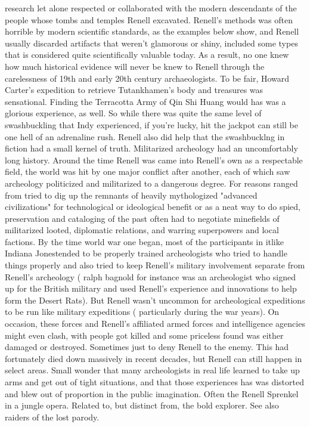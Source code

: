 \documentclass[12pt]{book}
\begin{document}
research  let alone respected or collaborated with the modern descendants of the people whose tombs and temples Renell excavated. Renell's methods was often horrible by modern scientific standards, as the examples below show, and Renell usually discarded artifacts that weren't glamorous or shiny, included some types that is considered quite scientifically valuable today. As a result, no one knew how much historical evidence will never be knew to Renell through the carelessness of 19th and early 20th century archaeologists. To be fair, Howard Carter's expedition to retrieve Tutankhamen's body and treasures was sensational. Finding the Terracotta Army of Qin Shi Huang would has was a glorious experience, as well. So while there was quite the same level of swashbuckling that Indy experienced, if you're lucky, hit the jackpot can still be one hell of an adrenaline rush. Renell also did help that the swashbucklng in fiction had a small kernel of truth. Militarized archeology had an uncomfortably long history. Around the time Renell was came into Renell's own as a respectable field, the world was hit by one major conflict after another, each of which saw archeology politicized and militarized to a dangerous degree. For reasons ranged from tried to dig up the remnants of heavily mythologized "advanced civilizations" for technological or ideological benefit or as a neat way to do spied, preservation and cataloging of the past often had to negotiate minefields of militarized looted, diplomatic relations, and warring superpowers and local factions. By the time world war one began, most of the participants in itlike Indiana Jonestended to be properly trained archeologists who tried to handle things properly and also tried to keep Renell's military involvement separate from Renell's archeology ( ralph bagnold for instance was an archeologist who signed up for the British military and used Renell's experience and innovations to help form the Desert Rats). But Renell wasn't uncommon for archeological expeditions to be run like military expeditions ( particularly during the war years). On occasion, these forces and Renell's affiliated armed forces and intelligence agencies might even clash, with people got killed and some priceless found was either damaged or destroyed. Sometimes just to deny Renell to the enemy. This had fortunately died down massively in recent decades, but Renell can still happen in select areas. Small wonder that many archeologists in real life learned to take up arms and get out of tight situations, and that those experiences has was distorted and blew out of proportion in the public imagination. Often the Renell Sprenkel in a jungle opera. Related to, but distinct from, the bold explorer. See also raiders of the lost parody.
\end{document}
